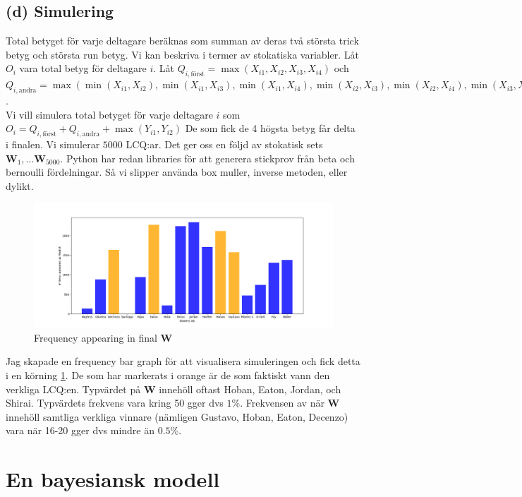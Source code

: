 \documentclass{assignment}
\begin{document}
\subsection*{(d) Simulering}
Total betyget för varje deltagare beräknas som summan av deras två största trick betyg och största run betyg. Vi
kan beskriva i termer av stokatiska variabler. Låt $O_i$ vara total betyg för deltagare $i$.
Låt $Q_{i,\text{först}}=\max(X_{i1},X_{i2},X_{i3},X_{i4})$ och 
\\$Q_{i,\text{andra}}=\max(\min(X_{i1}, X_{i2}), \min(X_{i1}, X_{i3}), \min(X_{i1}, X_{i4}), \min(X_{i2}, X_{i3}), \min(X_{i2}, X_{i4}), \min(X_{i3}, X_{i4}))$.
\\Vi vill simulera total betyget för varje deltagare $i$ som $O_i=Q_{i,\text{först}}+Q_{i,\text{andra}}+\max(Y_{i1},Y_{i2})$
De som fick de 4 högsta betyg får delta i finalen. Vi simulerar $5000$ LCQ:ar. Det ger oss en följd av stokatisk sets $\mathbf{W}_1,...\mathbf{W}_{5000}$.
Python har redan libraries för att generera stickprov från beta och bernoulli fördelningar. Så vi slipper 
använda box muller, inverse metoden, eller dylikt. 
\begin{figure}[!h]
    \caption{Frequency appearing in final $\mathbf{W}$}
    \begin{center}
        \includegraphics[width = 200mm]{assets/freq_bar_graph.png} 
    \end{center}
    \label{Histogram 2}
\end{figure}
Jag skapade en frequency bar graph för att visualisera simuleringen och fick detta i en körning \cref{Histogram 2}.
De som har markerats i orange är de som faktiskt vann den verkliga LCQ:en.
Typvärdet på $\mathbf{W}$ innehöll oftast Hoban, Eaton, Jordan, och Shirai. Typvärdets frekvens vara kring 50 gger dvs $1\%$. 
Frekvensen av när $\mathbf{W}$ innehöll samtliga verkliga vinnare (nämligen Gustavo, Hoban, Eaton, Decenzo) vara när 16-20 gger dvs mindre än $0.5\%$.  

\newpage
\newpage
\section{En bayesiansk modell}
\end{document}
